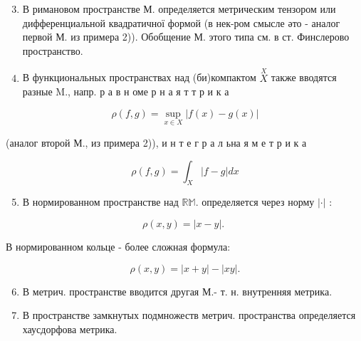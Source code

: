 \documentclass[10pt]{article}
\begin{document}
\begin{enumerate}

  \setcounter{enumi}{2}

  \item В римановом пространстве М. определяется метрическим тензором или дифференциальной квадратичної формой (в нек-ром смысле әто - аналог первой М. из примера 2)). Обобщение М. этого типа см. в ст. Финслерово пространство.



  \item В функциональных пространствах над (би)компактом $\stackrel{X}{X}$ также вводятся разные M., напр. р а в н оме р н а я т т р и к а



\end{enumerate}



\[

\rho(f, g)=\sup _{x \in X}|f(x)-g(x)|

\]



(аналог второй М., из примера 2)), и н т е г р а л ьна я м е т р и к а



\[

\rho(f, g)=\int_{X}|f-g| d x

\]



\begin{enumerate}

  \setcounter{enumi}{4}

  \item В нормированном пространстве над $\mathbb{R} \mathbb{M}$. определяется через норму $|\cdot|$ :

\end{enumerate}



\[

\rho(x, y)=|x-y| \text {. }

\]



В нормированном кольце - более сложная формула:



\[

\rho(x, y)=|x+y|-|x y| .

\]



\begin{enumerate}

  \setcounter{enumi}{5}

  \item В метрич. пространстве вводится другая М.- т. н. внутренняя метрика.



  \item В пространстве замкнутых подмножеств метрич. пространства определяется хаусдорфова метрика.



\end{enumerate}
\end{document}
